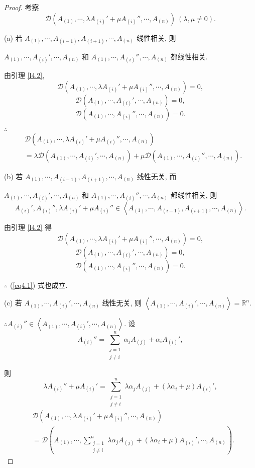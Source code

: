 \documentclass[color=black,device=normal,lang=cn,mode=geye]{elegantnote}
\begin{document}
\begin{proof}
    考察
    \[\mathcal{D}(A_{(1)},\cdots,\lambda A_{(i)}'+\mu A_{(i)}'',\cdots,A_{(n)})\ (\lambda,\mu\neq0).\]

    (a) 若 $A_{(1)},\cdots,A_{(i-1)},A_{(i+1)},\cdots,A_{(n)}$ 线性相关, 则
    
    $A_{(1)},\cdots,A_{(i)}',\cdots,A_{(n)}$ 和 $A_{(1)},\cdots,A_{(i)}'',\cdots,A_{(n)}$ 都线性相关.
    
    由引理 \ref{l4.2},
    \[\mathcal{D}(A_{(1)},\cdots,\lambda A_{(i)}'+\mu A_{(i)}'',\cdots,A_{(n)})=0,\]
    \[\mathcal{D}(A_{(1)},\cdots,A_{(i)}',\cdots,A_{(n)})=0,\]
    \[\mathcal{D}(A_{(1)},\cdots,A_{(i)}'',\cdots,A_{(n)})=0.\]

    $\therefore$
    \begin{equation}\label{eq4.1}
        \begin{aligned}
            & \mathcal{D}(A_{(1)},\cdots,\lambda A_{(i)}'+\mu A_{(i)}'',\cdots,A_{(n)}) \\
            & =\lambda\mathcal{D}(A_{(1)},\cdots,A_{(i)}',\cdots,A_{(n)})+\mu\mathcal{D}(A_{(1)},\cdots,A_{(i)}'',\cdots,A_{(n)}).
        \end{aligned}
    \end{equation}

    (b) 若 $A_{(1)},\cdots,A_{(i-1)},A_{(i+1)},\cdots,A_{(n)}$ 线性无关, 而
    
    $A_{(1)},\cdots,A_{(i)}',\cdots,A_{(n)}$ 和 $A_{(1)},\cdots,A_{(i)}'',\cdots,A_{(n)}$ 都线性相关, 则
    \[A_{(i)}',A_{(i)}'',\lambda A_{(i)}'+\mu A_{(i)}''\in\left<A_{(1)},\cdots,A_{(i-1)},A_{(i+1)},\cdots,A_{(n)}\right>.\]

    由引理 \ref{l4.2} 得
    \[\mathcal{D}(A_{(1)},\cdots,\lambda A_{(i)}'+\mu A_{(i)}'',\cdots,A_{(n)})=0,\]
    \[\mathcal{D}(A_{(1)},\cdots,A_{(i)}',\cdots,A_{(n)})=0,\]
    \[\mathcal{D}(A_{(1)},\cdots,A_{(i)}'',\cdots,A_{(n)})=0.\]

    $\therefore$ (\ref{eq4.1}) 式也成立.

    (c) 若 $A_{(1)},\cdots,A_{(i)}',\cdots,A_{(n)}$ 线性无关, 则 $\left<A_{(1)},\cdots,A_{(i)}',\cdots,A_{(n)}\right>=\mathbb{R}^n.$

    $\therefore A_{(i)}''\in\left<A_{(1)},\cdots,A_{(i)}',\cdots,A_{(n)}\right>$. 设
    \[A_{(i)}''=\sum\limits_{\substack{j=1\\j\neq i}}^{n}\alpha_jA_{(j)}+\alpha_iA_{(i)}',\]

    则
    \[\lambda A_{(i)}''+\mu A_{(i)}'=\sum\limits_{\substack{j=1\\j\neq i}}^{n}\lambda\alpha_jA_{(j)}+(\lambda\alpha_i+\mu)A_{(i)}',\]
    \begin{align*}
        & \mathcal{D}(A_{(1)},\cdots,\lambda A_{(i)}'+\mu A_{(i)}'',\cdots,A_{(n)}) \\
        & =\mathcal{D}\left(A_{(1)},\cdots,\sum\limits_{\substack{j=1\\j\neq i}}^{n}\lambda\alpha_jA_{(j)}+(\lambda\alpha_i+\mu)A_{(i)}',\cdots,A_{(n)}\right).
    \end{align*}


\end{proof}
\end{document}
